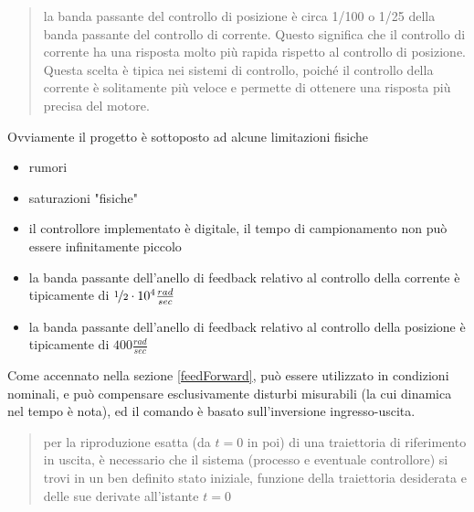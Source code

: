 \documentclass[10pt, letterpaper]{report}
\begin{document}
\begin{quotation}
    la banda passante del controllo di posizione è circa 1/100 o 1/25 della banda passante del controllo di corrente. Questo significa che il controllo di corrente ha una risposta molto più rapida rispetto al controllo di posizione. Questa scelta è tipica nei sistemi di controllo, poiché il controllo della corrente è solitamente più veloce e permette di ottenere una risposta più precisa del motore.
\end{quotation}
Ovviamente il progetto è sottoposto ad alcune limitazioni fisiche \begin{itemize}
    \item rumori 
    \item saturazioni "fisiche"     
    \item il controllore implementato è digitale, il tempo di campionamento non può essere infinitamente piccolo 
    \item la banda passante dell'anello di feedback relativo al controllo della corrente è tipicamente di $\nicefrac{1}{2}\cdot 10^{4}\frac{rad}{sec}$
    \item la banda passante dell'anello di feedback relativo al controllo della posizione è tipicamente di $400\frac{rad}{sec}$ 
\end{itemize}
Come accennato nella sezione \ref{feedForward}, può essere utilizzato in condizioni nominali, e può compensare esclusivamente disturbi misurabili (la cui dinamica nel tempo è nota), ed il comando è basato sull'inversione ingresso-uscita.\begin{quote}
    per la riproduzione esatta (da $t = 0$ in poi) di una traiettoria di riferimento in uscita, è
necessario che il sistema (processo e eventuale controllore) si trovi in un ben definito
stato iniziale, funzione della traiettoria desiderata e delle sue derivate all'istante $t = 0$
\end{quote}
\end{document}
